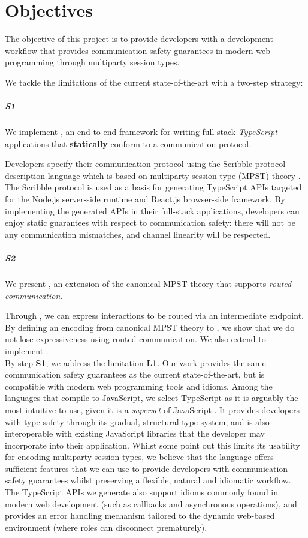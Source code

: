 \section{Objectives}

The objective of this project is to provide
developers with a development workflow
that provides communication safety guarantees in modern
web programming through multiparty session types.

We tackle the limitations of the current
state-of-the-art with a two-step strategy:

\subparagraph{S1}
We implement \codegen, an end-to-end framework
for writing full-stack \textit{TypeScript} applications that
\textbf{statically} conform to a communication protocol.

Developers specify their communication protocol using
the Scribble protocol description language \cite{Scribble}
which is based on multiparty session type (MPST) theory \cite{MPST}.
The Scribble protocol is used as a basis for generating
TypeScript APIs targeted for the Node.js server-side runtime
and React.js browser-side framework.
By implementing the generated APIs in their full-stack applications,
developers can enjoy static guarantees with respect 
to communication safety: 
there will not be any communication mismatches,
and channel linearity will be respected.

\subparagraph{S2}
We present \newtheory, an extension of the canonical MPST
theory that supports \textit{routed communication}.

Through \newtheory, we can express interactions to be
routed via an intermediate endpoint.
By defining an encoding from canonical MPST theory
to \newtheory, we show that we do not lose expressiveness
using routed communication.
We also extend \codegen to implement \newtheory.
\\

By step \textbf{S1}, we address the limitation \textbf{L1}.
Our work provides the same communication safety guarantees
as the current state-of-the-art, but 
is compatible with modern web programming tools and idioms.
Among the languages that compile to JavaScript,
we select TypeScript as it is arguably the most intuitive
to use, given it is a \textit{superset} of JavaScript 
\cite{UnderstandingTypeScript}.
It provides developers
with type-safety through its gradual, structural type system,
and is also interoperable with existing JavaScript libraries
that the developer may incorporate into their application.
Whilst some \cite{MVU2020} point out this limits its usability for
encoding multiparty session types, we believe that the language
offers sufficient features that we can use to provide developers with
communication safety guarantees whilst preserving a flexible, natural
and idiomatic workflow.
The TypeScript APIs we generate also support idioms commonly
found in modern web development (such as callbacks and
asynchronous operations), and provides an error handling
mechanism tailored to the dynamic web-based environment
(where roles can disconnect prematurely).

